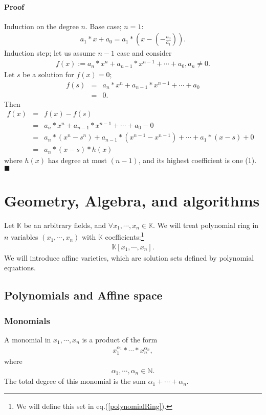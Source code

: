 \documentclass[11pt]{book}
\begin{document}
\subsubsection{Proof}
Induction on the degree $n$.
Base case; $n=1$:
\begin{eqnarray}
a_1*x +a_0 = a_1*\left(x - (-\frac{a_0}{a_1})\right).
\end{eqnarray}
Induction step; let us assume $n-1$ case and consider
\begin{eqnarray}
f(x) := a_n * x^n + a_{n-1} * x^{n-1} + \cdots + a_0, a_n \neq 0.
\end{eqnarray}
Let $s$ be a solution for $f(x) =0$;
\begin{eqnarray}
f(s) &=& a_n * x^n + a_{n-1} * x^{n-1} + \cdots + a_0 \\
&=& 0.
\end{eqnarray}
Then
\begin{eqnarray}
f(x) &=& f(x) - f(s)\\
&=& a_n * x^n + a_{n-1} * x^{n-1} + \cdots + a_0 - 0 \\
&=& a_n * (x^n-s^n) + a_{n-1} * (x^{n-1}-x^{n-1}) + \cdots + a_1*(x-s) + 0 \qquad\qquad \\
&=& a_n * (x-s) * h(x)
\end{eqnarray}
where $h(x)$ has degree at most $(n-1)$, and its highest coefficient is one (1).\\
$\blacksquare$


\chapter{Geometry, Algebra, and algorithms}
Let $\mathbb{K}$ be an arbitrary fields, and $\forall x_1, \cdots, x_n \in \mathbb{K}$.
We will treat polynomial ring in $n$ variables $(x_1, \cdots, x_n)$ with  $\mathbb{K}$ coefficients:\footnote{ We will define this set in eq.(\ref{polynomialRing}).}
\begin{eqnarray}
\mathbb{K}[x_1,\cdots,x_n].
\end{eqnarray}
We will introduce affine varieties, which are solution sets defined by polynomial equations.

\section{Polynomials and Affine space}
\subsection{Monomials}
A monomial in $x_1, \cdots, x_n$ is a product of the form
\begin{eqnarray}
x_1^{\alpha_1} * \cdots * x_n^{\alpha_n},
\end{eqnarray}
where
\begin{eqnarray}
\alpha_1, \cdots, \alpha_n \in \mathbb{N}.
\end{eqnarray}
The total degree of this monomial is the sum $\alpha_1+ \cdots + \alpha_n$.
\end{document}
